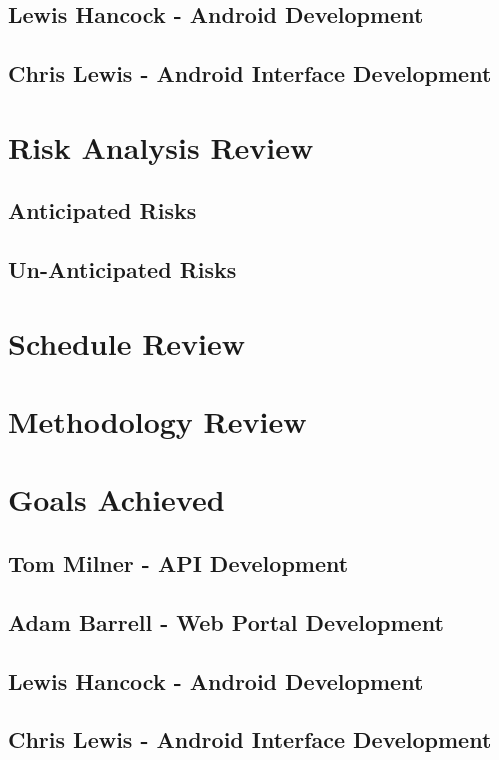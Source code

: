 \documentclass[11pt,a4paper]{report}
\begin{document}
\subsection{Lewis Hancock - Android Development}
\subsection{Chris Lewis - Android Interface Development}

\section{Risk Analysis Review}
\label{sec:risk-analysis-review}
\subsection{Anticipated Risks}
\label{sec:anticipated-risks}
\subsection{Un-Anticipated Risks}
\label{sec:unanticipated-risks}
\section{Schedule Review}
\label{sec:schedule-review}
\section{Methodology Review}
\label{sec:methodology-review}
\section{Goals Achieved}
\label{sec:goals-achieved}

\subsection{Tom Milner - API Development}
\subsection{Adam Barrell - Web Portal Development}
\subsection{Lewis Hancock - Android Development}
\subsection{Chris Lewis - Android Interface Development}
\end{document}
